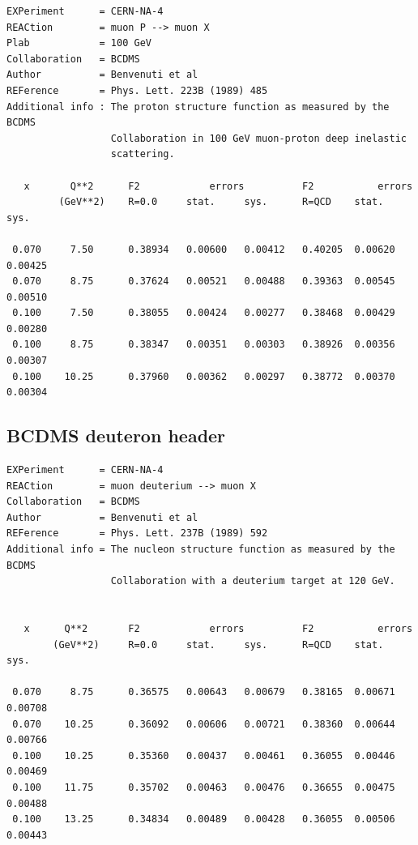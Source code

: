 \documentclass[12pt,a4paper]{report}
\begin{document}
\begin{Verbatim}[fontsize=\small]
EXPeriment      = CERN-NA-4 
REACtion        = muon P --> muon X                                   
Plab            = 100 GeV
Collaboration   = BCDMS                    
Author          = Benvenuti et al 
REFerence       = Phys. Lett. 223B (1989) 485                            
Additional info : The proton structure function as measured by the BCDMS 
                  Collaboration in 100 GeV muon-proton deep inelastic 
                  scattering.

   x       Q**2      F2            errors          F2           errors 
         (GeV**2)    R=0.0     stat.     sys.      R=QCD    stat.     sys.

 0.070     7.50      0.38934   0.00600   0.00412   0.40205  0.00620   0.00425  
 0.070     8.75      0.37624   0.00521   0.00488   0.39363  0.00545   0.00510  
 0.100     7.50      0.38055   0.00424   0.00277   0.38468  0.00429   0.00280  
 0.100     8.75      0.38347   0.00351   0.00303   0.38926  0.00356   0.00307  
 0.100    10.25      0.37960   0.00362   0.00297   0.38772  0.00370   0.00304  
\end{Verbatim}

\subsection{BCDMS deuteron \cite{BCDMS:Deuteron} header}

\begin{Verbatim}[fontsize=\small]
EXPeriment      = CERN-NA-4                       
REACtion        = muon deuterium --> muon X                             
Collaboration   = BCDMS               
Author          = Benvenuti et al 
REFerence       = Phys. Lett. 237B (1989) 592                           
Additional info = The nucleon structure function as measured by the BCDMS 
                  Collaboration with a deuterium target at 120 GeV.


   x      Q**2       F2            errors          F2           errors 
        (GeV**2)     R=0.0     stat.     sys.      R=QCD    stat.     sys.

 0.070     8.75      0.36575   0.00643   0.00679   0.38165  0.00671   0.00708  
 0.070    10.25      0.36092   0.00606   0.00721   0.38360  0.00644   0.00766  
 0.100    10.25      0.35360   0.00437   0.00461   0.36055  0.00446   0.00469  
 0.100    11.75      0.35702   0.00463   0.00476   0.36655  0.00475   0.00488  
 0.100    13.25      0.34834   0.00489   0.00428   0.36055  0.00506   0.00443  
\end{Verbatim}
\end{document}
